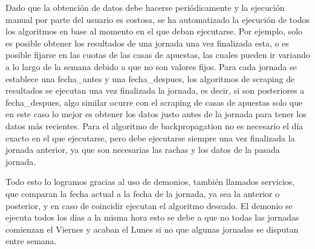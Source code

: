 Dado que la obtención de datos debe hacerse periódicamente y la ejecución manual por parte del usuario es costosa, se ha automatizado la ejecución de todos los algoritmos en base al momento en el que deban ejecutarse. Por ejemplo, solo es posible obtener los resultados de una jornada una vez finalizada esta, o es posible fijarse en las cuotas de las casas de apuestas, las cuales pueden ir variando a lo largo de la semana debido a que no son valores fijos.
Para cada jornada se establece una fecha\_antes y una fecha\_despues, los algoritmos de scraping de resultados se ejecutan una vez finalizada la jornada, es decir, si son posteriores a fecha\_despues, algo similar ocurre con el scraping de casas de apuestas solo que en este caso lo mejor es obtener los datos justo antes de la jornada para tener los datos más recientes. Para el algoritmo de backpropagation no es necesario el día exacto en el que ejecutarse, pero debe ejecutarse siempre una vez finalizada la jornada anterior, ya que son necesarias las rachas y los datos de la pasada jornada.

Todo esto lo logramos gracias al uso de demonios, también llamados servicios, que comparan la fecha actual a la fecha de la jornada, ya sea la anterior o posterior, y en caso de coincidir ejecutan el algoritmo deseado. El demonio se ejecuta todos los dias a la misma hora esto se debe a que no todas las jornadas comienzan el Viernes y acaban el Lunes si no que algunas jornadas se disputan entre semana.